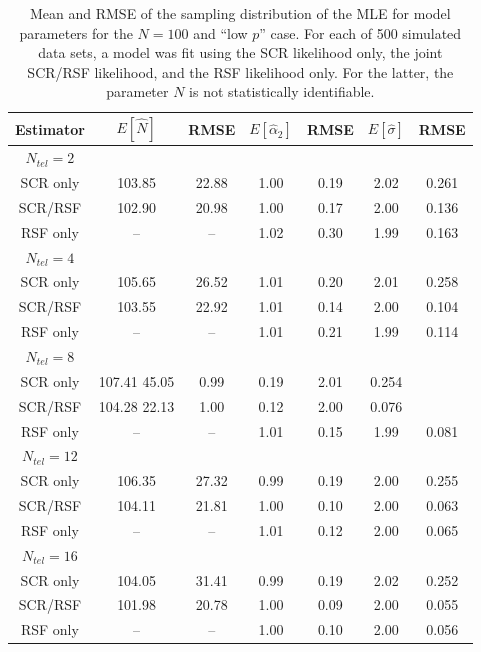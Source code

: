 \documentclass[12pt]{article}
\begin{document}
\begin{table}
\centering
\caption{Mean and RMSE of the sampling distribution of the MLE for
  model parameters for the $N=100$ and ``low $p$'' case. For each of
  500 simulated data sets, a model was fit using the SCR likelihood
  only, the joint SCR/RSF likelihood, and the RSF likelihood only. For
  the latter, the parameter $N$ is not statistically identifiable. }
\begin{tabular}{ccccccc}
\hline \hline
Estimator & $E[\hat{N}]$ & RMSE & $E[\hat{\alpha}_{2}]$ & RMSE &
$E[\hat{\sigma}]$ & RMSE \\
 \hline
$N_{tel} = 2$ &      &      &       &      &    &      \\
SCR only     &103.85& 22.88&   1.00& 0.19& 2.02& 0.261 \\
SCR/RSF      &102.90& 20.98&   1.00& 0.17& 2.00& 0.136\\
RSF only     &--    & --   &  1.02 & 0.30& 1.99& 0.163\\
$N_{tel}=4$   &      &      &       &     &     &        \\
SCR only     &105.65& 26.52&   1.01& 0.20& 2.01& 0.258 \\
SCR/RSF      &103.55& 22.92&   1.01& 0.14& 2.00& 0.104\\
RSF only     & --   & --   &  1.01 & 0.21& 1.99& 0.114\\
$N_{tel}=8$   &      &      &       &     &     &       \\
SCR only     &107.41  45.05&   0.99& 0.19& 2.01& 0.254 \\
SCR/RSF      &104.28  22.13&   1.00& 0.12& 2.00& 0.076\\
RSF only     &--    & --    &  1.01& 0.15& 1.99& 0.081\\
$N_{tel}=12$  &      &       &      &     &      &      \\
SCR only     &106.35&  27.32& 0.99& 0.19 & 2.00& 0.255\\
SCR/RSF      &104.11&  21.81& 1.00& 0.10 & 2.00& 0.063\\
RSF only     & --   &  --   & 1.01& 0.12 & 2.00& 0.065\\
$N_{tel}=16$  &      &       &     &      &     &       \\
SCR only     &104.05&  31.41& 0.99& 0.19 & 2.02& 0.252\\
SCR/RSF      &101.98&  20.78& 1.00& 0.09 & 2.00& 0.055\\
RSF only     & --   &  --   & 1.00& 0.10 & 2.00& 0.056\\
\end{tabular}
\label{tab.lowp}
\end{table}
\end{document}
